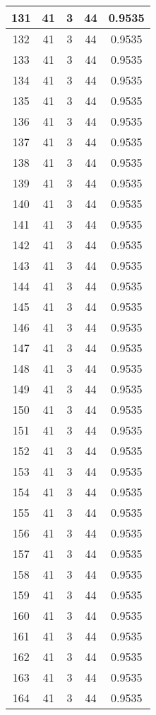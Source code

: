\documentclass[letterpaper, 12pt]{article}
\begin{document}
\begin{longtable}{|c|c|c|c|c|}
\hline
131 & 41 & 3 & 44 & 0.9535 \\
\hline
132 & 41 & 3 & 44 & 0.9535 \\
\hline
133 & 41 & 3 & 44 & 0.9535 \\
\hline
134 & 41 & 3 & 44 & 0.9535 \\
\hline
135 & 41 & 3 & 44 & 0.9535 \\
\hline
136 & 41 & 3 & 44 & 0.9535 \\
\hline
137 & 41 & 3 & 44 & 0.9535 \\
\hline
138 & 41 & 3 & 44 & 0.9535 \\
\hline
139 & 41 & 3 & 44 & 0.9535 \\
\hline
140 & 41 & 3 & 44 & 0.9535 \\
\hline
141 & 41 & 3 & 44 & 0.9535 \\
\hline
142 & 41 & 3 & 44 & 0.9535 \\
\hline
143 & 41 & 3 & 44 & 0.9535 \\
\hline
144 & 41 & 3 & 44 & 0.9535 \\
\hline
145 & 41 & 3 & 44 & 0.9535 \\
\hline
146 & 41 & 3 & 44 & 0.9535 \\
\hline
147 & 41 & 3 & 44 & 0.9535 \\
\hline
148 & 41 & 3 & 44 & 0.9535 \\
\hline
149 & 41 & 3 & 44 & 0.9535 \\
\hline
150 & 41 & 3 & 44 & 0.9535 \\
\hline
151 & 41 & 3 & 44 & 0.9535 \\
\hline
152 & 41 & 3 & 44 & 0.9535 \\
\hline
153 & 41 & 3 & 44 & 0.9535 \\
\hline
154 & 41 & 3 & 44 & 0.9535 \\
\hline
155 & 41 & 3 & 44 & 0.9535 \\
\hline
156 & 41 & 3 & 44 & 0.9535 \\
\hline
157 & 41 & 3 & 44 & 0.9535 \\
\hline
158 & 41 & 3 & 44 & 0.9535 \\
\hline
159 & 41 & 3 & 44 & 0.9535 \\
\hline
160 & 41 & 3 & 44 & 0.9535 \\
\hline
161 & 41 & 3 & 44 & 0.9535 \\
\hline
162 & 41 & 3 & 44 & 0.9535 \\
\hline
163 & 41 & 3 & 44 & 0.9535 \\
\hline
164 & 41 & 3 & 44 & 0.9535 \\

\end{longtable}
\end{document}
